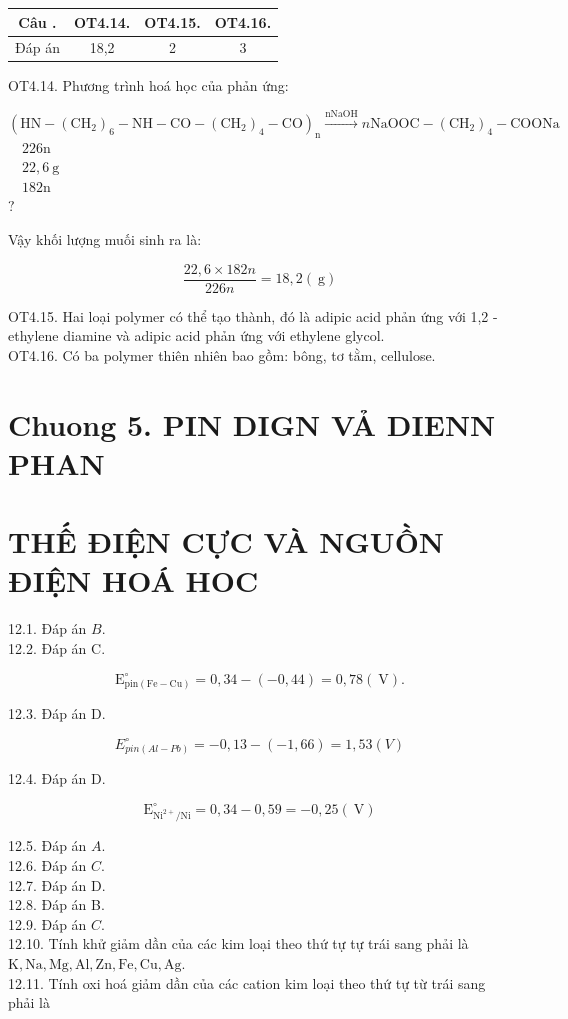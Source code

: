 \documentclass[10pt]{article}
\begin{document}
\begin{center}
\begin{tabular}{|c|c|c|c|}
\hline
Câu . & OT4.14. & OT4.15. & OT4.16. \\
\hline
Đáp án & 18,2 & 2 & 3 \\
\hline
\end{tabular}
\end{center}

OT4.14. Phương trình hoá học của phản ứng:

$\left(\mathrm{HN}-\left(\mathrm{CH}_{2}\right)_{6}-\mathrm{NH}-\mathrm{CO}-\left(\mathrm{CH}_{2}\right)_{4}-\mathrm{CO}\right)_{\mathrm{n}} \xrightarrow{\mathrm{nNaOH}} n \mathrm{NaOOC}-\left(\mathrm{CH}_{2}\right)_{4}-\mathrm{COONa}$\\
$\quad 226 \mathrm{n}$\\
$\quad 22,6 \mathrm{~g}$\\
$\quad 182 \mathrm{n}$\\
$?$

Vậy khối lượng muối sinh ra là:

$$
\frac{22,6 \times 182 n}{226 n}=18,2(\mathrm{~g})
$$

OT4.15. Hai loại polymer có thể tạo thành, đó là adipic acid phản ứng với 1,2 -ethylene diamine và adipic acid phản ứng với ethylene glycol.\\
OT4.16. Có ba polymer thiên nhiên bao gồm: bông, tơ tằm, cellulose.

\section*{Chuong 5. PIN DIGN VẢ DIENN PHAN}
\section*{THẾ ĐIỆN CỰC VÀ NGUỒN ĐIỆN HOÁ HOC}
12.1. Đáp án $B$.\\
12.2. Đáp án C.

$$
\mathrm{E}_{\mathrm{pin}(\mathrm{Fe}-\mathrm{Cu})}^{\circ}=0,34-(-0,44)=0,78(\mathrm{~V}) .
$$

12.3. Đáp án D.

$$
E_{p i n(A l-P b)}^{\circ}=-0,13-(-1,66)=1,53(V)
$$

12.4. Đáp án D.

$$
\mathrm{E}_{\mathrm{Ni}^{2+} / \mathrm{Ni}}^{\circ}=0,34-0,59=-0,25(\mathrm{~V})
$$

12.5. Đáp án $A$.\\
12.6. Đáp án $C$.\\
12.7. Đáp án D.\\
12.8. Đáp án B.\\
12.9. Đáp án $C$.\\
12.10. Tính khử giảm dần của các kim loại theo thứ tự tự trái sang phải là $\mathrm{K}, \mathrm{Na}, \mathrm{Mg}, \mathrm{Al}, \mathrm{Zn}, \mathrm{Fe}, \mathrm{Cu}, \mathrm{Ag}$.\\
12.11. Tính oxi hoá giảm dần của các cation kim loại theo thứ tự từ trái sang phải là
\end{document}

